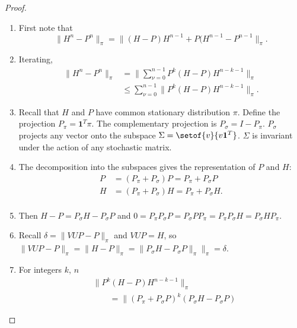 \documentclass[12pt]{article}
\begin{document}
\begin{proof}
    \begin{enumerate}
        \item
            First note that
            \[
                \| H^n - P^n \|_{\pi} = \|(H-P)H^{n-1}+P(H^{n-1} -P^{n-1}\|_
                {\pi}.
            \]
        \item
            Iterating,
            \begin{align*}
                \| H^n - P^n \|_{\pi} &= \| \sum_{\nu=0}^{n-1} P^k(H-P)H^
                {n-k-1}\|_{\pi} \\
                & \le \sum_{\nu=0}^{n-1} \| P^k(H-P)H^{n-k-1}\|_{\pi}.
            \end{align*}
        \item
            Recall that \( H \) and \( P \) have common stationary
            distribution \( \pi \).  Define the projection \( P_{\pi} =
            \mathbf{1}^T \pi \).  The complementary projection is \( P_{\sigma}
            = I - P_{\pi} \). \( P_{\sigma} \) projects any vector onto
            the subspace \( \Sigma = \setof{v}{v \mathbf{1}^T} \).  \(
            \Sigma \) is invariant under the action of any stochastic
            matrix.
        \item
            The decomposition into the subspaces gives the
            representation of \( P \) and \( H \):
            \begin{align*}
                P &= (P_{\pi} + P_{\sigma}) P = P_{\pi} + P_{\sigma}P \\
                H &= (P_{\pi} + P_{\sigma}) H = P_{\pi} + P_{\sigma}H.
                \\
            \end{align*}
        \item
            Then \( H - P = P_{\sigma}H - P_{\sigma}P \) and \( 0 = P_{\pi}
            P_{\sigma} P = P_{\sigma} P P_{\pi} = P_{\pi} P_{\sigma} H =
            P_{\sigma} H P_{\pi} \).
        \item
            Recall \( \delta = \| VUP - P \|_{\pi} \) and \( VUP = H \),
            so \( \| VUP - P \|_{\pi} = \| H - P \|_{\pi} = \|P_{\sigma}H
            - P_{\sigma}P\|_{\pi}\|_{\pi} = \delta \).
        \item
            For integers \( k \), \( n \)
            \begin{align*}
                & \| P^k(H-P)H^{n-k-1} \|_{\pi} \\
                & \qquad = \|(P_{\pi}+P_{\sigma}P)^k(P_{\sigma}H-P_{\sigma}P)

\end{align*}
\end{enumerate}
\end{proof}
\end{document}
